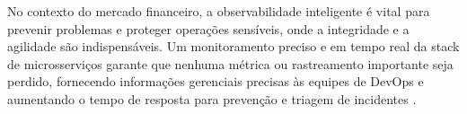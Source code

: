 No contexto do mercado financeiro, a observabilidade inteligente é vital para prevenir problemas e proteger operações sensíveis, onde a integridade e a agilidade são indispensáveis. Um monitoramento preciso e em tempo real da stack de microsserviços garante que nenhuma métrica ou rastreamento importante seja perdido, fornecendo informações gerenciais precisas às equipes de DevOps e aumentando o tempo de resposta para prevenção e triagem de incidentes \cite{baumgartner_observabilidade_2024}.
